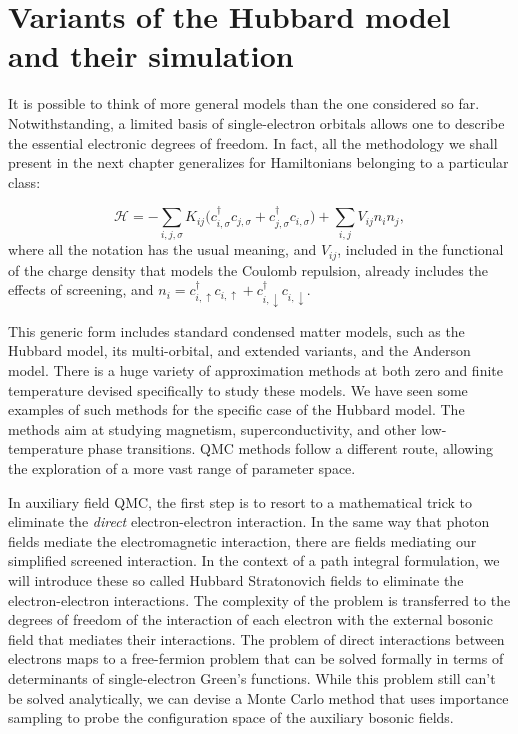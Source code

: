 \section{Variants of the Hubbard model and their simulation}\label{sec:variants}

It is possible to think of more general  models than the one considered so far.
Notwithstanding, a limited basis of single-electron orbitals allows one to describe the essential electronic degrees of freedom.
In fact, all the methodology we shall present in the next chapter generalizes for Hamiltonians belonging to a particular class:

\begin{equation}\label{eq:variantsForm}
\mathcal{H} = - \sum_{i, j, \sigma} K_{ij} \bigg( c_{i, \sigma}^\dagger c_{j, \sigma} + c_{j, \sigma}^\dagger c_{i, \sigma} \bigg) + \sum_{i, j} V_{ij} n_i n_j ,
\end{equation}
where all the notation has the usual meaning, and $V_{ij}$, included in the functional of the charge density that models the Coulomb repulsion, already includes the effects of screening, and $n_i = c_{i,\uparrow}^\dagger c_{i,\uparrow} + c_{i,\downarrow}^\dagger c_{i,\downarrow}$.

This generic form includes standard condensed matter models, such as the Hubbard model, its multi-orbital, and extended variants, and the Anderson model.
There is a huge variety of approximation methods at both zero and finite temperature devised specifically to study these models.
We have seen some examples of such methods for the specific case of the Hubbard model.
The methods aim at studying magnetism, superconductivity, and other low-temperature phase transitions.
\ac{QMC} methods follow a different route, allowing the exploration of a more vast range of parameter space.

In auxiliary field \ac{QMC}, the first step is to resort to a mathematical trick to eliminate the \emph{direct} electron-electron interaction.
In the same way that photon fields mediate the electromagnetic interaction, there are fields mediating our simplified screened interaction.
In the context of a path integral formulation, we will introduce these so called Hubbard Stratonovich fields to eliminate the electron-electron interactions.
The complexity of the problem is transferred to the degrees of freedom of the interaction of each electron with the external bosonic field that mediates their interactions.
The problem of direct interactions between electrons maps to a free-fermion problem that can be solved formally in terms of determinants of single-electron Green's functions.
While this problem still can't be solved analytically, we can devise a Monte Carlo method that uses importance sampling to probe the configuration space of the auxiliary bosonic fields.

